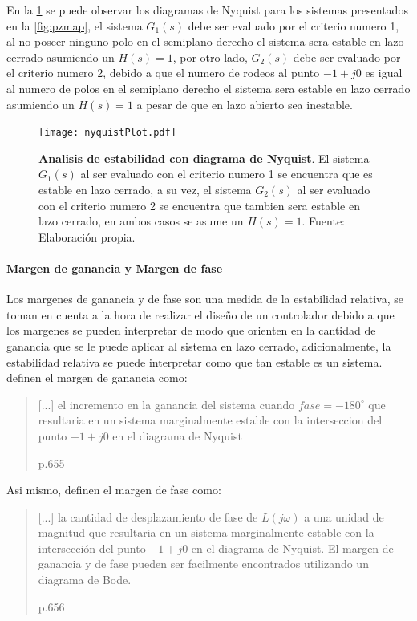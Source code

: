                 En la \cref{fig:nyquistPlot} se puede observar los diagramas de Nyquist para los sistemas presentados en la \cref{fig:pzmap}, el sistema $G_1(s)$ debe ser evaluado por el criterio numero 1, al no poseer ninguno polo en el semiplano derecho el sistema sera estable en lazo cerrado asumiendo un $H(s) = 1$, por otro lado, $G_2(s)$ debe ser evaluado por el criterio numero 2, debido a que el numero de rodeos al punto $-1 + j0$ es igual al numero de polos en el semiplano derecho el sistema sera estable en lazo cerrado asumiendo un $H(s) = 1$ a pesar de que en lazo abierto sea inestable.

                \begin{figure}[htb]
                    \centering
                    \texttt{[image: nyquistPlot.pdf]}
                    \caption[Ejemplo de analisis de estabilidad con diagrama de Nyquist]{\textbf{Analisis de estabilidad con diagrama de Nyquist}. El sistema $G_1(s)$ al ser evaluado con el criterio numero 1 se encuentra que es estable en lazo cerrado, a su vez, el sistema $G_2(s)$ al ser evaluado con el criterio numero 2 se encuentra que tambien sera estable en lazo cerrado, en ambos casos se asume un $H(s) = 1$. Fuente: Elaboración propia.} 
                    \label{fig:nyquistPlot}
                \end{figure}
            
            \paragraph{Margen de ganancia y Margen de fase}
                
                Los margenes de ganancia y de fase son una medida de la estabilidad relativa, se toman en cuenta a la hora de realizar el diseño de un controlador debido a que los margenes se pueden interpretar de modo que orienten en la cantidad de ganancia que se le puede aplicar al sistema en lazo cerrado, adicionalmente, la estabilidad relativa se puede interpretar como que tan estable es un sistema. \textcite{dorf2011modern} definen el margen de ganancia como: \blockquote[p.655]{[...] el incremento en la ganancia del sistema cuando $fase = -180^\circ$ que resultaria en un sistema marginalmente estable con la interseccion del punto $-1 + j0$ en el diagrama de Nyquist}. Asi mismo, \textcite{dorf2011modern} definen el margen de fase como: \blockquote[p.656]{[...] la cantidad de desplazamiento de fase de $L(j\omega)$ a una unidad de magnitud que resultaria en un sistema marginalmente estable con la intersección del punto $-1 + j0$ en el diagrama de Nyquist. El margen de ganancia y de fase pueden ser facilmente encontrados utilizando un diagrama de Bode.}

